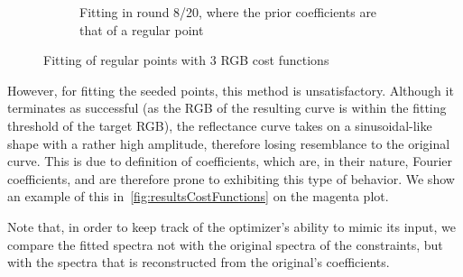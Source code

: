 \begin{figure}[t]
\begin{subfigure}[t]{0.45\textwidth}
		\caption{Fitting in round 8/20, where the prior coefficients are that of a regular point}
		\label{fig:costFunctionsRegularRound8}
	\end{subfigure} 
	\caption{Fitting of regular points with 3 RGB cost functions}
	\label{fig:costFunctionsRegularFitting}
\end{figure}

However, for fitting the seeded points, this method is unsatisfactory. Although it terminates as successful (as the RGB of the resulting curve is within the fitting threshold of the target RGB), the reflectance curve takes on a sinusoidal-like shape with a rather high amplitude, therefore losing resemblance to the original curve. This is due to definition of coefficients, which are, in their nature, Fourier coefficients, and are therefore prone to exhibiting this type of behavior. We show an example of this in~\cref{fig:resultsCostFunctions} on the magenta plot. 

Note that, in order to keep track of the optimizer's ability to mimic its input, we compare the fitted spectra not with the original spectra of the constraints, but with the spectra that is reconstructed from the original's coefficients.

